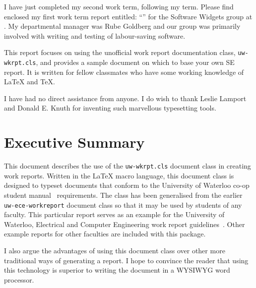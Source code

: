 \documentclass{uw-wkrpt}
\begin{document}
\begin{letter}
I have just completed my second work term, following my \theterm{} term.
Please find enclosed my first work term report entitled:
``\thetitle'' for the Software Widgets group at \theemployer.  
My departmental manager was Rube Goldberg
and our group was primarily involved with writing and testing
of labour-saving software.

This report focuses on using the unofficial work report
documentation class, \texttt{uw-wkrpt.cls}, and provides a
sample document on which to base your own SE report.  It is written for
fellow classmates who have some working knowledge of \LaTeX{} and \TeX{}.

I have had no direct assistance from anyone.  I do wish to thank Leslie 
Lamport and Donald E. Knuth for inventing such marvellous typesetting
tools.

\end{letter}

\section*{Executive Summary}
{}
This document describes the use of the \texttt{uw-wkrpt.cls}
document class in creating work reports.  Written in the 
\LaTeX{} macro language, this document class is designed to typeset 
documents that conform to the University of Waterloo co-op student 
manual~\cite{ref:coopman} requirements.  The class has been generalised
from the earlier \texttt{uw-ece-workreport} document class so that it
may be used by students of any faculty.  This particular report 
serves as an example for the University of Waterloo, Electrical and 
Computer Engineering work report guidelines~\cite{ref:eceguidelines}.  
Other example reports for other faculties are included with this package.

I also argue the advantages of using this document class over other
more traditional ways of generating a report.  I hope to convince the
reader that using this technology is superior to writing the document
in a WYSIWYG word processor.

\clearpage
\tableofcontents
\clearpage
\listoffigures
\clearpage
\listoftables
\end{document}
